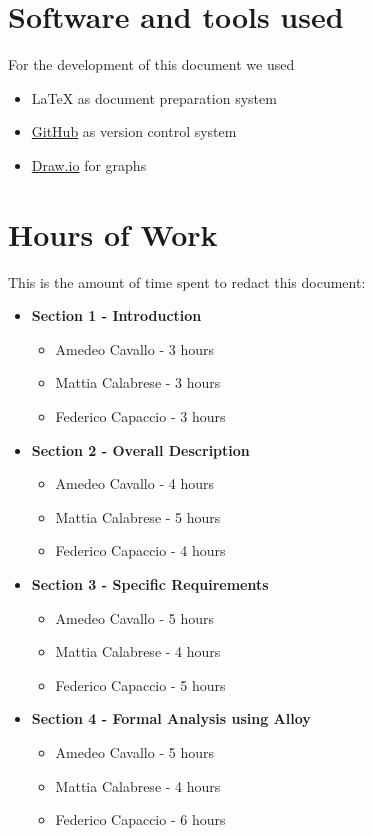 \begin{appendices}

	\section{Software and tools used}
	For the development of this document we used
	\begin{itemize}
		\item \LaTeX{} as document preparation system
		\item \href{http://github.com}{GitHub} as version control system
		\item \href{http://draw.io}{Draw.io} for graphs
	\end{itemize}
		
	\section{Hours of Work}
	This is the amount of time spent to redact this document:
	\begin{itemize}
		\item \textbf{Section 1 - Introduction}
		\begin{itemize}
			\item Amedeo Cavallo - 3 hours
			\item Mattia Calabrese - 3 hours
			\item Federico Capaccio - 3 hours
		\end{itemize}
		
		\item \textbf{Section 2 - Overall Description}
		\begin{itemize}
			\item Amedeo Cavallo - 4 hours
			\item Mattia Calabrese - 5 hours
			\item Federico Capaccio - 4 hours
		\end{itemize}
		
		\item \textbf{Section 3 - Specific Requirements}
		\begin{itemize}
			\item Amedeo Cavallo - 5 hours
			\item Mattia Calabrese - 4 hours
			\item Federico Capaccio - 5 hours
		\end{itemize}
		
		\item \textbf{Section 4 - Formal Analysis using Alloy}
		\begin{itemize}
			\item Amedeo Cavallo - 5 hours
			\item Mattia Calabrese - 4 hours
			\item Federico Capaccio - 6 hours
		\end{itemize}
	\end{itemize}
	

\end{appendices}
